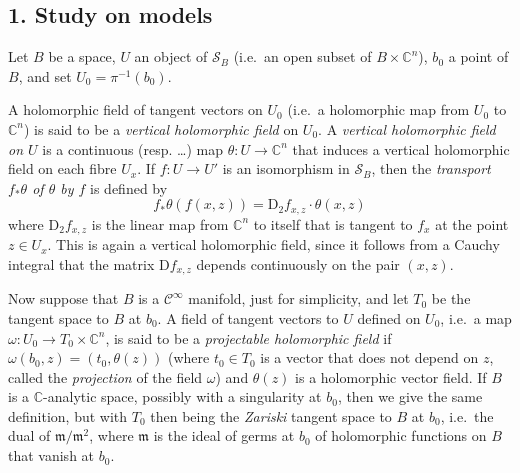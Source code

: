 \documentclass[british]{article}
\newcommand{\oldpage}[1]{\marginpar{\footnotesize$\Big\vert$ \textit{p.~#1}}}
\begin{document}
\subsection*{1. Study on models}\label{two-section-III.1}

Let \(B\) be a space, \(U\) an object of \(\mathscr{S}_B\) (i.e.~an open
subset of \(B\times\mathbb{C}^n\)), \(b_0\) a point of \(B\), and set
\(U_0=\pi^{-1}(b_0)\).

A holomorphic field of tangent vectors on \(U_0\) (i.e.~a holomorphic
map from \(U_0\) to \(\mathbb{C}^n\)) is said to be a \emph{vertical
holomorphic field} on \(U_0\). A \emph{vertical holomorphic field on
\(U\)} is a continuous (resp. \ldots) map
\(\theta\colon U\to\mathbb{C}^n\) that induces a vertical holomorphic
field on each fibre \(U_x\). If \(f\colon U\to U'\) is an isomorphism in
\(\mathscr{S}_B\), then the \emph{transport \(f_*\theta\) of \(\theta\)
by \(f\)} is defined by \[
  f_*\theta(f(x,z)) = \mathrm{D}_2 f_{x,z}\cdot\theta(x,z)
\] where \(\mathrm{D}_2 f_{x,z}\) is the linear map from
\(\mathbb{C}^n\) to itself that is tangent to \(f_x\) at the point
\(z\in U_x\). This is again a vertical holomorphic field, since it
follows from a Cauchy integral that the matrix \(\mathrm{D}f_{x,z}\)
depends continuously on the pair \((x,z)\).

Now suppose that \(B\) is a \(\mathscr{C}^\infty\) manifold, just for
simplicity, and let \(T_0\) be the tangent space to \(B\) at \(b_0\).
\oldpage{2-05} A field of tangent vectors to \(U\) defined on \(U_0\),
i.e.~a map \(\omega\colon U_0\to T_0\times\mathbb{C}^n\), is said to be
a \emph{projectable holomorphic field} if
\(\omega(b_0,z)=(t_0,\theta(z))\) (where \(t_0\in T_0\) is a vector that
does not depend on \(z\), called the \emph{projection} of the field
\(\omega\)) and \(\theta(z)\) is a holomorphic vector field. If \(B\) is
a \(\mathbb{C}\)-analytic space, possibly with a singularity at \(b_0\),
then we give the same definition, but with \(T_0\) then being the
\emph{Zariski} tangent space to \(B\) at \(b_0\), i.e.~the dual of
\(\mathfrak{m}/\mathfrak{m}^2\), where \(\mathfrak{m}\) is the ideal of
germs at \(b_0\) of holomorphic functions on \(B\) that vanish at
\(b_0\).
\end{document}
